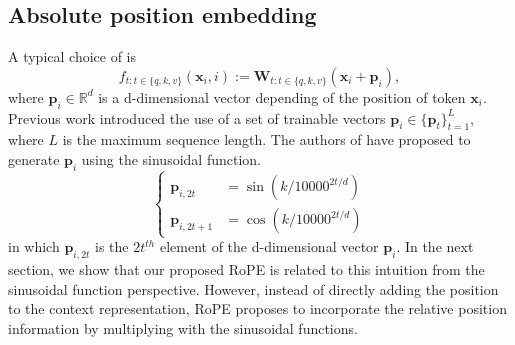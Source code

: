 \documentclass{article}
\def\p{{\boldsymbol p}}
\def\x{{\boldsymbol x}}
\def\W{{\boldsymbol W}}
\begin{document}
\subsection{Absolute position embedding}
A typical choice of  is 
\begin{equation}
	f_{t:t\in\{q,k,v\}}(\x_i,i):=\W_{t:t\in\{q,k,v\}}(\x_i+\p_i),
	\label{fn:adtv-posi}
\end{equation}
where $\p_i\in\mathbb{R}^{d}$ is a d-dimensional vector depending of the position of token $\x_i$. Previous work \cite{Devlin2019BERTPO,Lan2020ALBERT:2020,clark2020electra,Radford2019LanguageMA,Radford2018ImprovingLU:2018} introduced the use of a set of trainable vectors $\p_i\in\{\p_t\}_{t=1}^{L}$, where $L$ is the maximum sequence length. The authors of \cite{Vaswani:2017} have proposed to generate $\p_i$ using the sinusoidal function.
\begin{equation}
	\begin{cases}
		\p_{i,2t}&=\sin(k/10000^{2t/d})\\
		\p_{i,2t+1}&=\cos(k/10000^{2t/d})
	\end{cases}
	\label{fn:sins}
\end{equation}
in which $\p_{i,2t}$ is the $2t^{th}$ element of the d-dimensional vector $\p_i$. In the next section, we show that our proposed RoPE is related to this intuition from the sinusoidal function perspective. However, instead of directly adding the position to the context representation, RoPE proposes to incorporate the relative position information by multiplying with the sinusoidal functions.
\end{document}
